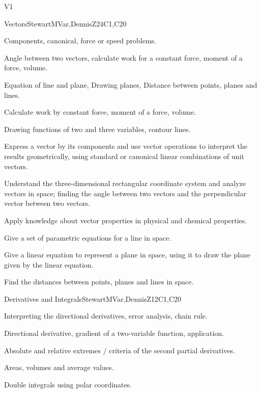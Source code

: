 \begin{syllabus}
\begin{competences}{V1}
    \item {}
    \item {}
\end{competences}

\begin{unit}{Vectors}{}{StewartMVar,DennisZ}{24}{C1,C20}
   \begin{topics}      
    \item Components, canonical, force or speed problems.
    \item Angle between two vectors, calculate work for a constant force, moment of a force, volume.
    \item Equation of line and plane, Drawing planes, Distance between points, planes and lines.
    \item Calculate work by constant force, moment of a force, volume.
    \item Drawing functions of two and three variables, contour lines.
  \end{topics}

   \begin{learningoutcomes}
    \item Express a vector by its components and use vector operations to interpret the results geometrically, using standard or canonical linear combinations of unit vectors.
    \item Understand the three-dimensional rectangular coordinate system and analyze vectors in space; finding the angle between two vectors and the perpendicular vector between two vectors.
    \item Apply knowledge about vector properties in physical and chemical properties. 
    \item Give a set of parametric equations for a line in space.
    \item Give a linear equation to represent a plane in space, using it to draw the plane given by the linear equation.
    \item Find the distances between points, planes and lines in space.
    \end{learningoutcomes}
\end{unit}

\begin{unit}{Derivatives and Integrals}{}{StewartMVar,DennisZ}{12}{C1,C20}
  \begin{topics}
    \item Interpreting the directional derivatives, error analysis, chain rule.
    \item Directional derivative, gradient of a two-variable function, application.
    \item Absolute and relative extremes / criteria of the second partial derivatives.
    \item Areas, volumes and average values.
    \item Double integrals using polar coordinates.
   \end{topics}
  

\end{unit}
\end{syllabus}
